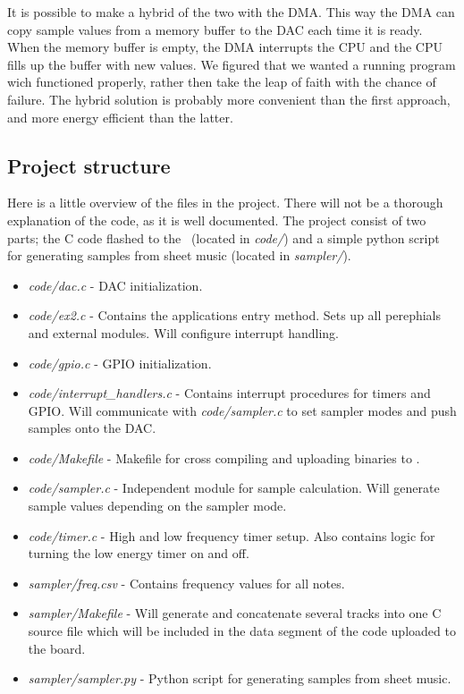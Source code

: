 It is possible to make a hybrid of the two with the DMA. This way the DMA can copy sample values from a memory buffer to the DAC each time it is ready. When the memory buffer is empty, the DMA interrupts the CPU and the CPU fills up the buffer with new values. We figured that we wanted a running program wich functioned properly, rather then take the leap of faith with the chance of failure. The hybrid solution is probably more convenient than the first approach, and more energy efficient than the latter.  


\subsection{Project structure}
Here is a little overview of the files in the project. There will not be a thorough explanation of the code, as it is well documented. The project consist of two parts; the C code flashed to the \boardName\ (located in \emph{code/}) and a simple python script for generating samples from sheet music (located in \emph{sampler/}).

\begin{itemize}
	\item \emph{code/dac.c} - DAC initialization.
	\item \emph{code/ex2.c} - Contains the applications entry method. Sets up all perephials and external modules. Will configure interrupt handling.
	\item \emph{code/gpio.c} - GPIO initialization.
	\item \emph{code/interrupt\_handlers.c} - Contains interrupt procedures for timers and GPIO. Will communicate with \emph{code/sampler.c} to set sampler modes and push samples onto the DAC.
	\item \emph{code/Makefile} - Makefile for cross compiling and uploading binaries to \boardName .
	\item \emph{code/sampler.c} - Independent module for sample calculation. Will generate sample values depending on the sampler mode.
	\item \emph{code/timer.c} - High and low frequency timer setup. Also contains logic for turning the low energy timer on and off.
	\item \emph{sampler/freq.csv} - Contains frequency values for all notes.
	\item \emph{sampler/Makefile} - Will generate and concatenate several tracks into one C source file which will be included in the data segment of the code uploaded to the board.
	\item \emph{sampler/sampler.py} - Python script for generating samples from sheet music.
\end{itemize}

